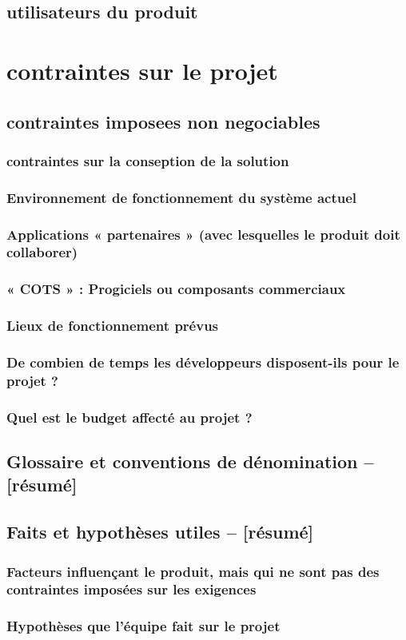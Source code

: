 \documentclass[a4]{article}
\begin{document}
		\subsection{utilisateurs du produit}
			
	\section{contraintes sur le projet}
		\subsection{contraintes imposees non negociables} 
			\subsubsection{contraintes sur la conseption de la solution}
			\subsubsection{ Environnement de fonctionnement du système actuel }
			\subsubsection{Applications « partenaires » (avec lesquelles le produit doit collaborer)}		
			\subsubsection{« COTS » : Progiciels ou composants commerciaux}
			\subsubsection{Lieux de fonctionnement prévus}
			\subsubsection{ De combien de temps les développeurs disposent-ils pour le projet ?}
			\subsubsection{ Quel est le budget affecté au projet ?}
		\subsection{Glossaire et conventions de dénomination – [résumé]}
		\subsection{Faits et hypothèses utiles – [résumé]}	
			\subsubsection{Facteurs influençant le produit, mais qui ne sont pas des contraintes imposées sur les exigences}
			\subsubsection{Hypothèses que l’équipe fait sur le projet}
		
		
		

							
\end{document}
